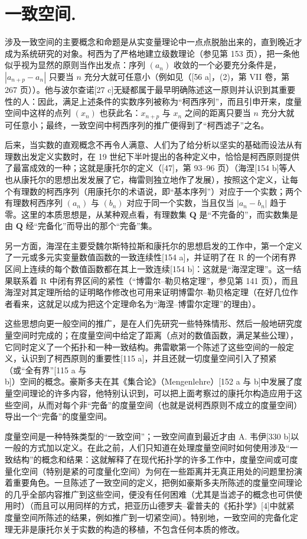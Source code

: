 \chapter{一致空间.}

涉及一致空间的主要概念和命题是从实变量理论中一点点脱胎出来的，直到晚近才成为系统研究的对象。柯西为了严格地建立级数理论（参见第 153 页），把一条他似乎视为显然的原则当作出发点：序列 \((a_{n})\) 收敛的一个必要充分条件是，\(|a_{n+p} - a_{n}|\) 只要当 \(n\) 充分大就可任意小（例如见（{[}56 a{]}，(2)，第 VII 卷，第 267 页））。他与波尔查诺{[}27 c{]}无疑都属于最早明确陈述这一原则并认识到其重要性的人：因此，满足上述条件的实数序列被称为“柯西序列”，而且引申开来，度量空间中这样的点列 \((x_{n})\) 也获此名：\(x_{n+p}\) 与 \(x_{n}\) 之间的距离只要当 \(n\) 充分大就可任意小；最终，一致空间中柯西序列的推广便得到了“柯西滤子”之名。

后来，当实数的直观概念不再令人满意、人们为了给分析以坚实的基础而设法从有理数出发定义实数时，在 19 世纪下半叶提出的各种定义中，恰恰是柯西原则提供了最富成效的一种；这就是康托尔的定义（{[}47{]}，第 93–96 页）（海涅{[}154 b{]}等人也从康托尔的思想出发发展了它，梅雷则独立地作了发展），按照这个定义，让每个有理数的柯西序列（用康托尔的术语说，即“基本序列”）对应于一个实数；两个有理数柯西序列 \((a_{n})\) 与 \((b_{n})\) 对应于同一个实数，当且仅当 \(|a_{n} - b_{n}|\) 趋于零。这里的本质思想是，从某种观点看，有理数集 \(\mathbf{Q}\) 是“不完备的”，而实数集是由 \(\mathbf{Q}\) 经“完备化”而导出的那个“完备”集。

另一方面，海涅在主要受魏尔斯特拉斯和康托尔的思想启发的工作中，第一个定义了一元或多元实变量数值函数的一致连续性{[}154 a{]}，并证明了在 R 的一个闭有界区间上连续的每个数值函数都在其上一致连续{[}154 b{]}：这就是“海涅定理”。这一结果联系着 R 中闭有界区间的紧性（“博雷尔–勒贝格定理”，参见第 141 页），而且海涅对其定理所给的证明略作修改也可用来证明博雷尔–勒贝格定理（在好几位作者看来，这就足以成为把这个定理命名为“海涅–博雷尔定理”的理由）。

这些思想向更一般空间的推广，是在人们先研究一些特殊情形、然后一般地研究度量空间时完成的；在度量空间中给定了距离（点对的数值函数，满足某些公理），它同时定义了一个拓扑和一种一致结构。弗雷歇第一个陈述了这些空间的一般定义，认识到了柯西原则的重要性{[}115 a{]}，并且还就一切度量空间引入了预紧（或“全有界”{[}115 a 与 b{]}）空间的概念。豪斯多夫在其《集合论》（Mengenlehre）{[}152 a 与 b{]}中发展了度量空间理论的许多内容，他特别认识到，可以把上面考察过的康托尔构造应用于这些空间，从而对每个非“完备”的度量空间（也就是说柯西原则不成立的度量空间）导出一个“完备”的度量空间。

度量空间是一种特殊类型的“一致空间”；一致空间直到最近才由 A. 韦伊{[}330 b{]}以一般的方式加以定义。在此之前，人们只知道在处理度量空间时如何使用涉及“一致结构”的概念和结果：这就解释了在现代拓扑学的许多工作中，度量空间或可度量化空间（特别是紧的可度量化空间）为何在一些距离并无真正用处的问题里扮演着重要角色。一旦陈述了一致空间的定义，把例如豪斯多夫所陈述的度量空间理论的几乎全部内容推广到这些空间，便没有任何困难（尤其是当滤子的概念也可供使用时）（而且可以用同样的方式，把亚历山德罗夫–霍普夫的《拓扑学》{[}4{]}中就紧度量空间所陈述的结果，例如推广到一切紧空间）。特别地，一致空间的完备化定理无非是康托尔关于实数的构造的移植，不包含任何本质的修改。

